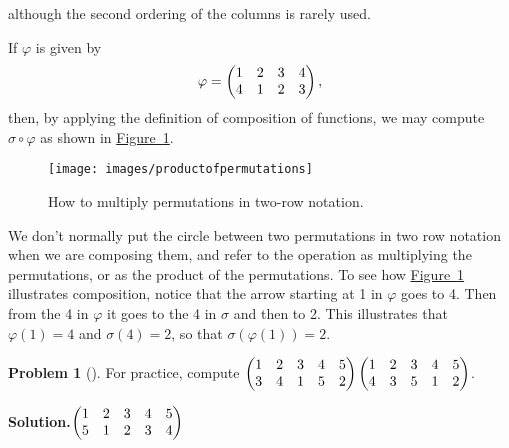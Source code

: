 \documentclass[10pt,]{book}
\theoremstyle{plain}
\theoremstyle{definition}
\newtheorem{activity}[project]{Problem}
\theoremstyle{definition}
\numberwithin{equation}{chapter}
\newcommand{\amp}{&}
\begin{document}
although the second ordering of the columns is rarely used.%
\par
If \(\varphi\) is given by%
\begin{equation*}
\varphi = \begin{pmatrix}1\amp 2\amp 3\amp 4\cr4\amp 1\amp 2\amp 3
\end{pmatrix} ,
\end{equation*}
then, by applying the definition of composition of functions, we may compute \(\sigma\circ
\varphi\) as shown in \hyperref[permutationproduct]{Figure~\ref{permutationproduct}}.%
\begin{figure}
\centering
\texttt{[image: images/productofpermutations]}
\caption{How to multiply permutations in two-row notation.\label{permutationproduct}}
\end{figure}
We don't normally put the circle between two permutations in two row notation when we are composing them, and refer to the operation as multiplying the permutations, or as the product of the permutations. To see how \hyperref[permutationproduct]{Figure~\ref{permutationproduct}} illustrates composition, notice that the arrow starting at 1 in \(\varphi\) goes to 4. Then from the 4 in \(\varphi\) it goes to the 4 in \(\sigma\) and then to 2. This illustrates that \(\varphi(1)=4\) and \(\sigma(4) =2\), so that \(\sigma(\varphi(1))=2\).%
\begin{activity}[]\label{activity-258}
For practice, compute \(\begin{pmatrix}1\amp 2\amp 3\amp 4\amp 5\cr3\amp 4\amp 1\amp 5\amp 2
\end{pmatrix}
\begin{pmatrix}1\amp 2\amp 3\amp 4\amp 5\cr 4\amp 3\amp 5\amp 1\amp 2
\end{pmatrix}\).%
\par\medskip\noindent%
\textbf{Solution.}\quad \(\begin{pmatrix}1\amp 2\amp 3\amp 4\amp 5\cr5\amp 1\amp 2\amp 3\amp 4
\end{pmatrix}\)%
\end{activity}
\typeout{************************************************}
\typeout{************************************************}
\end{document}
